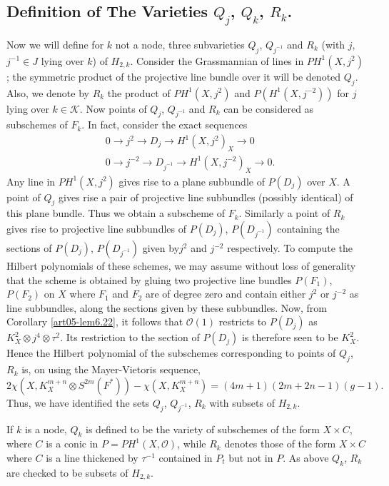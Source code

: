 \setcounter{subsection}{6}
\subsection{Definition of The Varieties \texorpdfstring{$Q_{j}$, $Q_{k}$,
$R_{k}$}{Qj}.}\label{art05-sec7.7} 

Now we will define for $k$ not a node, three subvarieties $Q_{j}$,
$Q_{j^{-1}}$ and $R_{k}$ (with $j$, $j^{-1}\in J$ lying over $k$) of
$H_{2,k}$. Consider the Grassmannian of lines in $PH^{1}(X,j^{2})$;
the symmetric product of the projective line bundle over it will be
denoted $Q_{j}$. Also, we denote by $R_{k}$ the product of
$PH^{1}(X,j^{2})$ and $P(H^{1}(X,j^{-2}))$ for $j$ lying over
$k\in \mathscr{K}$. Now points of $Q_{j}$, $Q_{j^{-1}}$ and $R_{k}$ can
be considered as subschemes of $F_{k}$. In fact, consider the exact
sequences 
\begin{align*}
& 0\to j^{2}\to D_{j}\to H^{1}(X,j^{2})_{X}\to 0\\
& 0\to j^{-2}\to D_{j^{-1}}\to H^{1}(X,j^{-2})_{X}\to 0.
\end{align*}
Any line in $PH^{1}(X,j^{2})$ gives rise to a plane subbundle of
$P(D_{j})$ over $X$. A point of $Q_{j}$ gives rise a pair of
projective line subbundles (possibly identical) of this plane
bundle. Thus we obtain a subscheme of $F_{k}$. Similarly a point of
$R_{k}$ gives rise to projective line subbundles of $P(D_{j})$,
$P(D_{j^{-1}})$ containing the sections of $P(D_{j})$, $P(D_{j^{-1}})$ given
by\pageoriginale $j^{2}$ and $j^{-2}$ respectively. To compute the
Hilbert polynomials of these schemes, we may assume without loss of
generality that the scheme is obtained by gluing two projective line
bundles $P(F_{1})$, $P(F_{2})$ on $X$ where $F_{1}$ and $F_{2}$ are of
degree zero and contain either $j^{2}$ or $j^{-2}$ as line subbundles,
along the sections given by these subbundles. Now, from Corollary 
\ref{art05-lem6.22}, it follows that $\mathscr{O}(1)$ restricts to
$P(D_{j})$ as $K^{2}_{X}\otimes j^{4}\otimes \tau^{2}$. Its
restriction to the section of $P(D_{j})$ is therefore seen to be
$K^{2}_{X}$. Hence the Hilbert polynomial of the subschemes
corresponding to points of $Q_{j}$, $R_{k}$ is, on using the
Mayer-Vietoris sequence,
$$
2\chi (X,K^{m+n}_{X}\otimes
S^{2m}(F^{*}))-\chi(X,K^{m+n}_{X})=(4m+1)(2m+2n-1)(g-1). 
$$
Thus, we have identified the sets $Q_{j}$, $Q_{j^{-1}}$, $R_{k}$ with
subsets of $H_{2,k}$.

If $k$ is a node, $Q_{k}$ is defined to be the variety of subschemes
of the form $X\times C$, where $C$ is a conic in
$P=PH^{1}(X,\mathscr{O})$, while $R_{k}$ denotes those of the form
$X\times C$ where $C$ is a line thickened by $\tau^{-1}$ contained in
$P_{t}$ but not in $P$. As above $Q_{k}$, $R_{k}$ are checked to be
subsets of $H_{2,k}$. 

